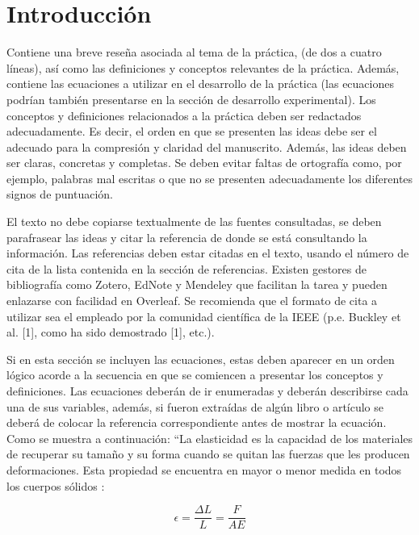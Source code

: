 \documentclass{replab}
\begin{document}
\bigskip
	

\bigskip
\saythanks
	
\section{Introducción}

Contiene una breve reseña asociada al tema de la práctica, (de dos a cuatro líneas), así como las definiciones y conceptos relevantes de la práctica. Además, contiene las ecuaciones a utilizar en el desarrollo de la práctica (las ecuaciones podrían también presentarse en la sección de desarrollo experimental). Los conceptos y definiciones relacionados a la práctica deben ser redactados adecuadamente. Es decir, el orden en que se presenten las ideas debe ser el adecuado para la compresión y claridad del manuscrito. Además, las ideas deben ser claras, concretas y completas. Se deben evitar faltas de ortografía como, por ejemplo, palabras mal escritas o que no se presenten adecuadamente los diferentes signos de puntuación.

El texto no debe copiarse textualmente de las fuentes consultadas, se deben parafrasear las ideas y citar la referencia de donde se está consultando la información. Las referencias deben estar citadas en el texto, usando el número de cita de la lista contenida en la sección de referencias. Existen gestores de bibliografía como Zotero, EdNote y Mendeley que facilitan la tarea y pueden enlazarse con facilidad en Overleaf. Se recomienda que el formato de cita a utilizar sea el empleado por la comunidad científica de la IEEE (p.e. Buckley et al. [1], como ha sido demostrado [1], etc.).

Si en esta sección se incluyen las ecuaciones, estas deben aparecer en un orden lógico acorde a la secuencia en que se comiencen a presentar los conceptos y definiciones.
Las ecuaciones deberán de ir enumeradas y deberán describirse cada una de sus variables, además, si fueron extraídas de algún libro o artículo se deberá de colocar la referencia correspondiente antes de mostrar la ecuación. Como se muestra a continuación:
“La elasticidad es la capacidad de los materiales de recuperar su tamaño y su forma cuando se quitan las fuerzas que les producen deformaciones. Esta propiedad se encuentra en mayor o menor medida en todos los cuerpos sólidos \cite{hecht}:

\begin{equation}
    \epsilon = \frac{\Delta L}{L} = \frac{F}{AE}
\end{equation}
\end{document}
